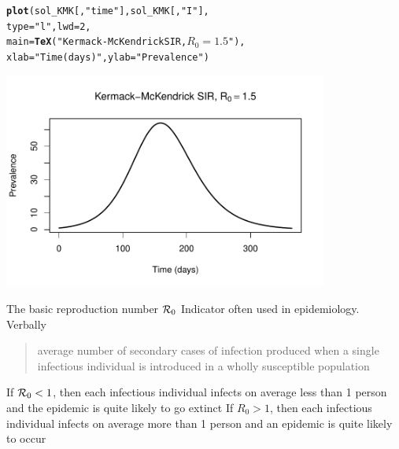 \documentclass[aspectratio=169]{beamer}\usepackage[]{graphicx}\usepackage[]{xcolor}
\makeatletter
\newcommand{\hlnum}[1]{\textcolor[rgb]{0.686,0.059,0.569}{#1}}%
\newcommand{\hlsng}[1]{\textcolor[rgb]{0.192,0.494,0.8}{#1}}%
\newcommand{\hldef}[1]{\textcolor[rgb]{0.345,0.345,0.345}{#1}}%
\newcommand{\hlkwc}[1]{\textcolor[rgb]{0.333,0.667,0.333}{#1}}%
\newcommand{\hlkwd}[1]{\textcolor[rgb]{0.737,0.353,0.396}{\textbf{#1}}}%
\newenvironment{kframe}{%
 \def\at@end@of@kframe{}%
 \ifinner\ifhmode%
  \def\at@end@of@kframe{\end{minipage}}%
  \begin{minipage}{\columnwidth}%
 \fi\fi%
 \def\FrameCommand##1{\hskip\@totalleftmargin \hskip-\fboxsep
 \colorbox{shadecolor}{##1}\hskip-\fboxsep
     \hskip-\linewidth \hskip-\@totalleftmargin \hskip\columnwidth}%
 \MakeFramed {\advance\hsize-\width
   \@totalleftmargin\z@ \linewidth\hsize
   \@setminipage}}%
 {\par\unskip\endMakeFramed%
 \at@end@of@kframe}
\newenvironment{knitrout}{}{} %
\makeatother
\begin{document}
\begin{frame}[fragile]{}
\begin{knitrout}
\color{fgcolor}\begin{kframe}
\begin{alltt}
\hlkwd{plot}\hldef{(sol_KMK[,} \hlsng{"time"}\hldef{], sol_KMK[,} \hlsng{"I"}\hldef{],}
     \hlkwc{type} \hldef{=} \hlsng{"l"}\hldef{,} \hlkwc{lwd} \hldef{=} \hlnum{2}\hldef{,}
     \hlkwc{main} \hldef{=} \hlkwd{TeX}\hldef{(}\hlsng{"Kermack-McKendrick SIR, $R_0=1.5$"}\hldef{),}
     \hlkwc{xlab} \hldef{=} \hlsng{"Time (days)"}\hldef{,} \hlkwc{ylab} \hldef{=} \hlsng{"Prevalence"}\hldef{)}
\end{alltt}
\end{kframe}
\end{knitrout}
\begin{center}
\includegraphics[width=0.8\textwidth]{FIGS/L04-KMK_R0eq1dot5-1.pdf}
\end{center}
\end{frame}


\begin{frame}{The basic reproduction number $\mathcal{R}_0$}
\bbullet Indicator often used in epidemiology. Verbally
\begin{quote}
  average number of secondary cases of infection produced when a single infectious individual is introduced in a wholly susceptible population
\end{quote}
\vfill
\bbullet If $\mathcal{R}_0<1$, then each infectious individual infects on average less than 1 person and the epidemic is quite likely to go extinct 
\vfill
\bbullet If $R_0>1$, then each infectious individual infects on average more than 1 person and an epidemic is quite likely to occur
\end{frame}
\end{document}
